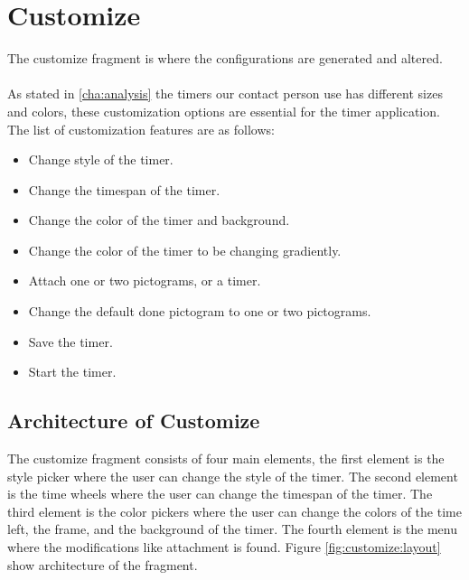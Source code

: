 \section{Customize}
The customize fragment is where the configurations are generated and altered.\\
\\
As stated in \autoref{cha:analysis} the timers our contact person use has different sizes and colors, these customization options are essential for the timer application.
The list of customization features are as follows:

\begin{itemize}
	\item Change style of the timer.
	\item Change the timespan of the timer.
	\item Change the color of the timer and background.
	\item Change the color of the timer to be changing gradiently.
	\item Attach one or two pictograms, or a timer.
	\item Change the default done pictogram to one or two pictograms.
	\item Save the timer.
	\item Start the timer.
\end{itemize}

\subsection{Architecture of Customize}
\label{subsec:cust_arch}
The customize fragment consists of four main elements, the first element is the style picker where the user can change the style of the timer.
The second element is the time wheels where the user can change the timespan of the timer.
The third element is the color pickers where the user can change the colors of the time left, the frame, and the background of the timer.
The fourth element is the menu where the modifications like attachment is found.
Figure \ref{fig:customize:layout} show architecture of the fragment.

